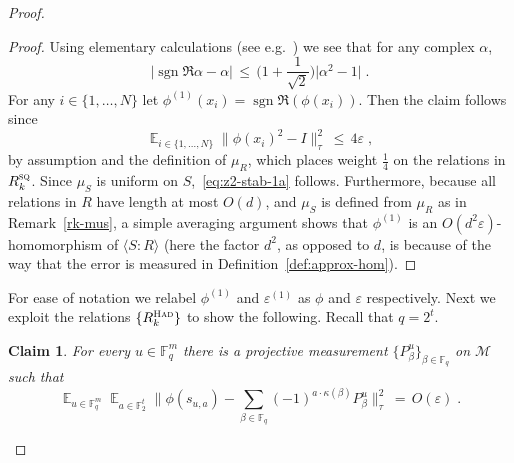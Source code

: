 \documentclass[11pt]{article}
\newtheorem{claim}[theorem]{Claim}
\theoremstyle{definition}
\newcommand{\Id}{\ensuremath{I}}
\DeclareMathOperator*{\Expectation}{\mathbb{E}}
\newcommand{\Es}[1]{\Expectation_{#1}}
\newcommand{\F}{\ensuremath{\mathbb{F}}}
\newcommand{\sq}{\textsc{sq}}
\newcommand{\mM}{\ensuremath{\mathcal{M}}}
\newcommand{\had}{\textsc{Had}}
\newcommand{\eps}{\varepsilon}
\DeclareMathOperator{\sgn}{sgn}
\begin{document}
\begin{proof}
\begin{proof}
Using elementary calculations (see e.g.~\cite[Lemma 3.6]{slofstra2019set}) we see that for any complex $\alpha$, 
\[ \big| \sgn\Re\alpha-\alpha\big| \,\leq\, \Big(1+\frac{1}{\sqrt{2}}\Big) \big|\alpha^2 -1 \big|\;.\]
For any $i\in \{1,\ldots,N\}$ let $\phi^{(1)}(x_i) = \sgn\Re (\phi(x_i))$. Then the claim follows since 
\[ \Es{i\in\{1,\ldots,N\}} \big\| \phi(x_i)^2-\Id \big\|_\tau^2 \,\leq\, 4\eps\;,\]
by assumption and the definition of $\mu_R$, which places weight $\frac{1}{4}$ on the relations in $R_k^\sq$. Since $\mu_S$ is uniform on $S$,~\eqref{eq:z2-stab-1a} follows. Furthermore, because all relations in $R$ have length at most $O(d)$, and $\mu_S$ is defined from $\mu_R$ as in Remark~\ref{rk-mus}, a simple averaging argument shows that $\phi^{(1)}$ is an $O(d^2\eps)$-homomorphism of $\langle S:R\rangle$ (here the factor $d^2$, as opposed to $d$, is because of the way that the error is measured in Definition~\ref{def:approx-hom}).
\end{proof}

For ease of notation we relabel $\phi^{(1)}$ and $\eps^{(1)}$ as $\phi$ and $\eps$ respectively. Next we exploit the relations $\{R^\had_k\}$ to show the following. Recall that $q=2^t$.

\begin{claim}\label{claim:z2-stab-2}
For every $u\in \F_q^m$ there is a projective measurement $\{P^u_\beta\}_{\beta\in \F_{q}}$ on $\mM$ such that 
\begin{equation}\label{eq:z2-stab-2}
 \Es{u\in \F_q^m} \Es{a\in \F_2^t} \Big\| \phi(s_{u,a}) - \sum_{\beta\in\F_q} (-1)^{a \cdot \kappa(\beta)} P^u_\beta \Big\|_\tau^2 \,=\, O(\eps)\;. 
\end{equation}
\end{claim}


\end{proof}
\end{document}
